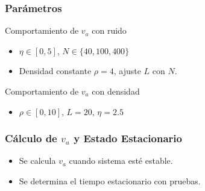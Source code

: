 \begin{frame}
\frametitle{Parámetros}
Comportamiento de \(v_a\) con ruido
    \begin{itemize}
    \item \(\eta \in [0, 5]\), \(N \in \{40, 100, 400\}\)
    \item Densidad constante \(\rho = 4\), ajuste \(L\) con \(N\).
    \end{itemize}
Comportamiento de \(v_a\) con densidad
    \begin{itemize}
    \item \(\rho \in [0, 10]\), \(L = 20\), \(\eta = 2.5\)
\end{itemize}

\end{frame}


\begin{frame}
\frametitle{Cálculo de \(v_a\) y Estado Estacionario}
\begin{itemize}
    \item Se calcula \(v_a\) cuando sistema esté estable.
    \item Se determina el tiempo estacionario con pruebas.
\end{itemize}
\end{frame}


